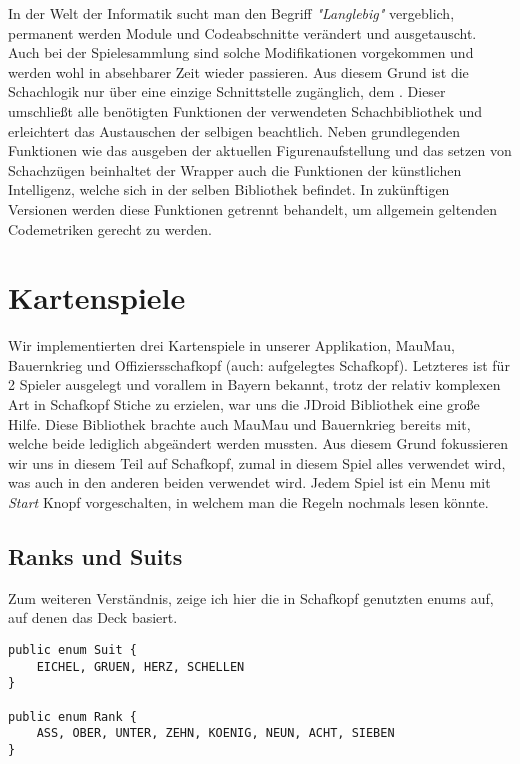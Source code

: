 In der Welt der Informatik sucht man den Begriff \emph{"Langlebig"} vergeblich,
permanent werden Module und Codeabschnitte verändert und ausgetauscht. Auch bei
der Spielesammlung sind solche Modifikationen vorgekommen und werden wohl in
absehbarer Zeit wieder passieren. Aus diesem Grund ist die Schachlogik nur über
eine einzige Schnittstelle zugänglich, dem . Dieser
umschließt alle benötigten Funktionen der verwendeten Schachbibliothek und
erleichtert das Austauschen der selbigen beachtlich. Neben grundlegenden
Funktionen wie das ausgeben der aktuellen Figurenaufstellung und das setzen von
Schachzügen beinhaltet der Wrapper auch die Funktionen der künstlichen
Intelligenz, welche sich in der selben Bibliothek befindet. In zukünftigen
Versionen werden diese Funktionen getrennt behandelt, um allgemein geltenden
Codemetriken gerecht zu werden. 

\section{Kartenspiele}
\sectionauthor{\philipp}

Wir implementierten drei Kartenspiele in unserer Applikation, MauMau,
Bauernkrieg und Offiziersschafkopf (auch: aufgelegtes Schafkopf). Letzteres ist
für 2 Spieler ausgelegt und vorallem in Bayern bekannt, trotz der relativ
komplexen Art in Schafkopf Stiche zu erzielen, war uns die JDroid Bibliothek
eine große Hilfe. Diese Bibliothek brachte auch MauMau und Bauernkrieg bereits
mit, welche beide lediglich abgeändert werden mussten.  Aus diesem Grund
fokussieren wir uns in diesem Teil auf Schafkopf, zumal in diesem Spiel alles
verwendet wird, was auch in den anderen beiden verwendet wird.  Jedem Spiel ist
ein Menu mit \emph{Start} Knopf vorgeschalten, in welchem man die Regeln
nochmals lesen könnte.

\subsection{Ranks und Suits}

Zum weiteren Verständnis, zeige ich hier die in Schafkopf genutzten enums auf,
auf denen das Deck basiert.

\begin{lstlisting}
public enum Suit {
	EICHEL, GRUEN, HERZ, SCHELLEN
}

public enum Rank {
	ASS, OBER, UNTER, ZEHN, KOENIG, NEUN, ACHT, SIEBEN
}
\end{lstlisting}

